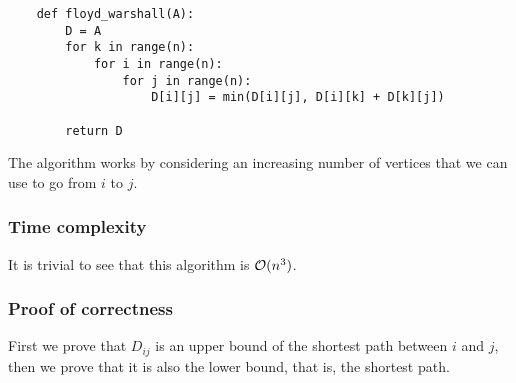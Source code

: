 \documentclass[12pt]{extarticle}
\begin{document}
\begin{verbatim}
    def floyd_warshall(A):
        D = A
        for k in range(n):
            for i in range(n):
                for j in range(n):
                    D[i][j] = min(D[i][j], D[i][k] + D[k][j])

        return D
\end{verbatim}

The algorithm works by considering an increasing number of vertices that we can use to go from $i$ to $j$.

\subsubsection{Time complexity}

It is trivial to see that this algorithm is $\mathcal{O}(n^3)$.

\subsubsection{Proof of correctness}

First we prove that $D_{ij}$ is an upper bound of the shortest path between $i$ and $j$, then we prove that it is also the lower bound, that is, the shortest path.
\end{document}
